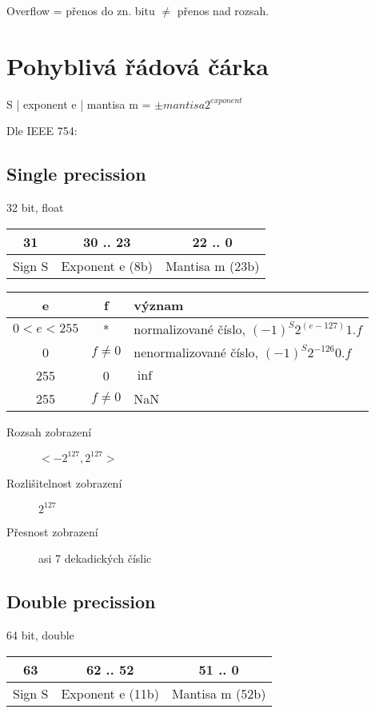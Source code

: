 \documentclass[a4wide]{report}
\begin{document}
Overflow = přenos do zn. bitu $\neq$ přenos nad rozsah.

\section{Pohyblivá řádová čárka}

S | exponent e | mantisa m = $\pm mantisa 2^{exponent}$ 

Dle IEEE 754:
\subsection{Single precission}
32 bit, float

\begin{tabular}{| c | c | c |}
	\hline
	31 & 30 .. 23 & 22 .. 0 \\ \hline
	Sign S  & Exponent e (8b) & Mantisa m (23b) \\ \hline
\end{tabular}

\begin{tabular}{| c | c | l |}
	\hline
	e & f & význam \\ \hline
	$0<e<255$ & * & normalizované číslo, $(-1)^S 2^{(e-127)} 1.f$  \\ \hline
	0 & $f \neq 0$ & nenormalizované číslo, $(-1)^S 2^{-126} 0.f$  \\ \hline
	255 & 0 & $\inf$ \\ \hline
	255 & $f \neq 0$ & NaN \\ \hline
\end{tabular}

\begin{description}
	\item[Rozsah zobrazení] $< -2^{127}, 2^{127} >$
	\item[Rozlišitelnost zobrazení] $2^127$
	\item[Přesnost zobrazení] asi 7 dekadických číslic
\end{description}

\subsection{Double precission}
64 bit, double

\begin{tabular}{| c | c | c |}
	\hline
	63 & 62 .. 52 & 51 .. 0 \\ \hline
	Sign S  & Exponent e (11b) & Mantisa m (52b) \\ \hline
\end{tabular}
\end{document}
